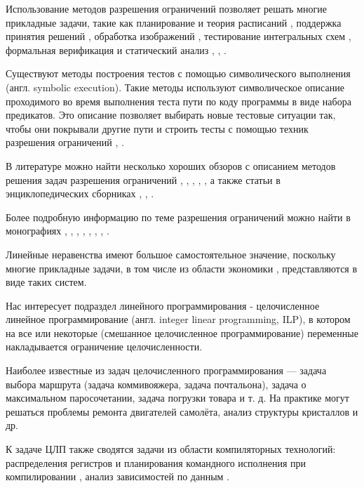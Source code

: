 \documentclass[a4paper,14pt,russian]{extreport}
\begin{document}
\par Использование методов разрешения ограничений позволяет решать многие прикладные задачи, такие как планирование \cite{kautz} и теория расписаний \cite{barnier}, поддержка принятия решений \cite{saraev}, обработка изображений \cite{montanari}, тестирование интегральных схем \cite{hooker}, формальная верификация и статический анализ \cite{collavizza}, \cite{dick}, \cite{cormac}.
\par Существуют методы построения тестов с помощью символического выполнения (англ. symbolic execution). Такие методы используют символическое описание проходимого во время выполнения теста пути по коду программы в виде набора предикатов. Это описание позволяет выбирать новые тестовые ситуации так, чтобы они покрывали другие пути и строить тесты с помощью техник разрешения ограничений \cite{gotlieb}, \cite{boyapati}. 
\par В литературе можно найти несколько хороших обзоров с описанием методов решения задач разрешения ограничений \cite{kumar}, \cite{dechter_frost}, \cite{bartak}, \cite{meseguer}, \cite{miguel}, а также статьи в энциклопедических сборниках  \cite{dechter_networks}, \cite{hower}, \cite{mackworth}.
\par Более подробную информацию по теме разрешения ограничений можно найти в монографиях \cite{apt}, \cite{fruehwirth}, \cite{marriott}, \cite{rossi}, \cite{hentenryck}, \cite{hentenryck_michel_deville}, \cite{hentenryck_opl}, \cite{hentenryck_michel}. 
\par Линейные неравенства имеют большое самостоятельное значение, поскольку многие прикладные задачи, в том числе из области экономики \cite{kantorovich}, представляются в виде таких систем. 
\par Нас интересует подраздел линейного программирования - целочисленное линейное программирование (англ. integer linear programming, ILP), в котором на все или некоторые (смешанное целочисленное программирование) переменные накладывается ограничение целочисленности. 
\par Наиболее известные из задач целочисленного программирования — задача выбора маршрута (задача коммивояжера, задача почтальона), задача о максимальном паросочетании, задача погрузки товара и т. д. На практике могут решаться проблемы ремонта двигателей самолёта, анализ структуры кристаллов и др. \cite{matai} 
\par К задаче ЦЛП также сводятся задачи из области компиляторных технологий: распределения регистров и планирования командного исполнения при компилировании \cite{chang}, анализ зависимостей по данным \cite{libby}.
\end{document}
